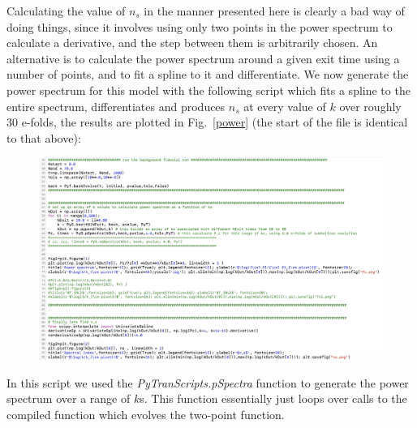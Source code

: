 \documentclass[10pt,
amsmath,amssymb,
aps,prd,nofootinbib,eqsecnum,a4paper]{revtex4}
\begin{document}
Calculating the value of $n_s$ in the manner presented 
here is clearly a bad way of doing things, since it involves using only two points 
in the power spectrum to calculate a derivative, and the step between them is arbitrarily chosen. 
An alternative is to calculate the power spectrum 
around a given exit time using a number of points, and to fit a spline to it and differentiate. We now generate the 
power spectrum for this model with the 
following script which fits a spline to the entire spectrum, differentiates and produces $n_s$ at every value of 
$k$ over roughly 30 e-folds, the results are plotted in Fig.~\ref{power} (the start of the file is identical to that above):
\begin{figure}[H]
\centering
\includegraphics[width=18cm]{shot6b}
\end{figure}

\noindent In this script we used the {\it PyTranScripts.pSpectra} function to generate the power spectrum over a 
range of $k$s. This function essentially just loops over calls to the compiled function which evolves the two-point function.
\end{document}
